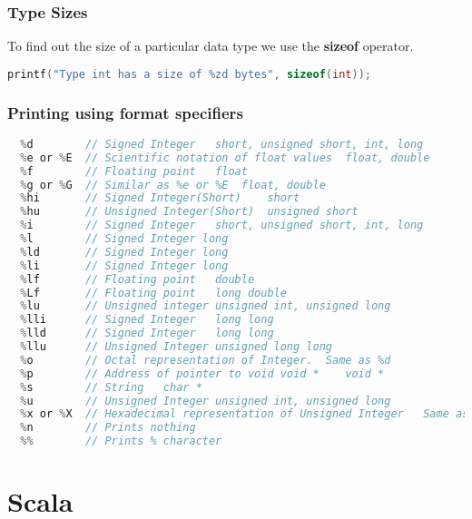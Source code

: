 \documentclass[11pt,a4paper,oneside]{book}
\begin{document}
\section{Type Sizes}
To find out the size of a particular data type we use the \textbf{sizeof} operator.

\begin{lstlisting}[language=C]
  printf("Type int has a size of %zd bytes", sizeof(int));
\end{lstlisting}

\section{Printing using format specifiers}
\begin{lstlisting}[language=C, title=Print format specifiers]
  %c        // Character    char, unsigned char
  %d        // Signed Integer	short, unsigned short, int, long
  %e or %E  // Scientific notation of float values	float, double
  %f        // Floating point	float
  %g or %G  // Similar as %e or %E	float, double
  %hi       // Signed Integer(Short)	short
  %hu       // Unsigned Integer(Short)	unsigned short
  %i        // Signed Integer	short, unsigned short, int, long
  %l        // Signed Integer long
  %ld       // Signed Integer long
  %li       // Signed Integer long
  %lf       // Floating point	double
  %Lf       // Floating point	long double
  %lu       // Unsigned integer	unsigned int, unsigned long
  %lli      // Signed Integer	long long
  %lld      // Signed Integer	long long
  %llu      // Unsigned Integer	unsigned long long
  %o        // Octal representation of Integer.	 Same as %d
  %p        // Address of pointer to void void *	void *
  %s        // String	char *
  %u        // Unsigned Integer	unsigned int, unsigned long
  %x or %X  // Hexadecimal representation of Unsigned Integer	Same as %d
  %n        // Prints nothing	
  %%        // Prints % character
\end{lstlisting}

\part{Scala}
\setcounter{chapter}{0}
\end{document}
